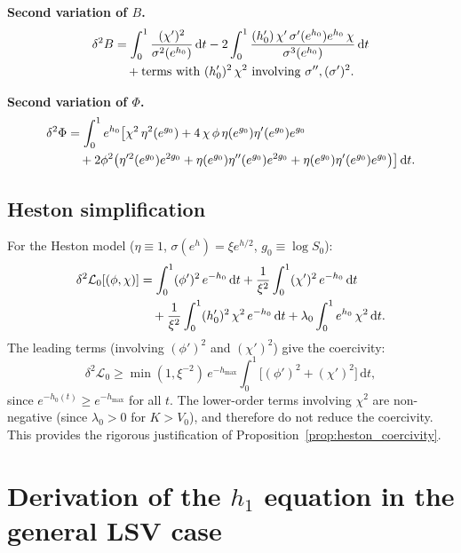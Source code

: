 \documentclass[11pt]{article}
\theoremstyle{definition}
\newcommand{\dd}{\mathrm{d}}
\begin{document}
\textbf{Second variation of $B$.}
\begin{align}
  \delta^2 B &= \int_0^1 \frac{(\chi')^2}{\sigma^2(e^{h_0})}\,\dd t - 2\int_0^1 \frac{(h_0')\,\chi'\,\sigma'(e^{h_0})e^{h_0}\,\chi}{\sigma^3(e^{h_0})}\,\dd t \notag\\
  &\quad + \text{terms with } (h_0')^2\,\chi^2 \text{ involving } \sigma'', (\sigma')^2.
\end{align}

\textbf{Second variation of $\Phi$.}
\begin{align}
  \delta^2\Phi &= \int_0^1 e^{h_0}\bigl[\chi^2\,\eta^2(e^{g_0}) + 4\,\chi\,\phi\,\eta(e^{g_0})\eta'(e^{g_0})e^{g_0} \notag\\
  &\quad + 2\phi^2\bigl(\eta'^2(e^{g_0})e^{2g_0} + \eta(e^{g_0})\eta''(e^{g_0})e^{2g_0} + \eta(e^{g_0})\eta'(e^{g_0})e^{g_0}\bigr)\bigr]\,\dd t.
\end{align}

\subsection{Heston simplification}

For the Heston model ($\eta \equiv 1$, $\sigma(e^h) = \xi e^{h/2}$, $g_0 \equiv \log S_0$):
\begin{align}
  \delta^2\mathcal{L}_0[(\phi,\chi)] &= \int_0^1 (\phi')^2\,e^{-h_0}\,\dd t + \frac{1}{\xi^2}\int_0^1 (\chi')^2\,e^{-h_0}\,\dd t \notag\\
  &\quad + \frac{1}{\xi^2}\int_0^1 (h_0')^2\,\chi^2\,e^{-h_0}\,\dd t + \lambda_0\int_0^1 e^{h_0}\,\chi^2\,\dd t.
\end{align}
The leading terms (involving $(\phi')^2$ and $(\chi')^2$) give the coercivity:
\begin{equation}
  \delta^2\mathcal{L}_0 \geq \min(1, \xi^{-2})\,e^{-h_{\max}}\int_0^1 \bigl[(\phi')^2 + (\chi')^2\bigr]\,\dd t,
\end{equation}
since $e^{-h_0(t)} \geq e^{-h_{\max}}$ for all $t$. The lower-order terms involving $\chi^2$ are non-negative (since $\lambda_0 > 0$ for $K > V_0$), and therefore do not reduce the coercivity. This provides the rigorous justification of Proposition~\ref{prop:heston_coercivity}.

\section{Derivation of the $h_1$ equation in the general LSV case}\label{app:h1_general}
\end{document}
